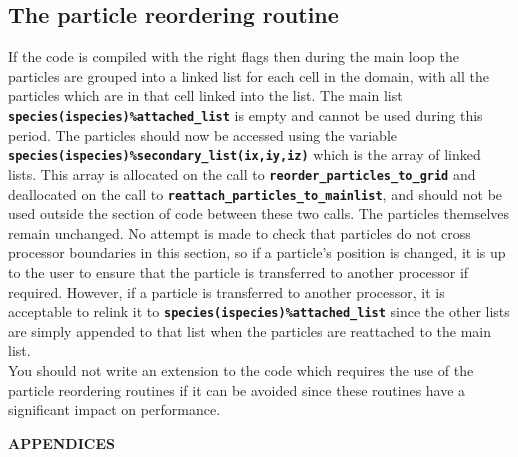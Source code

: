 \documentclass[12pt,a4paper]{article}
\newcommand{\inlinecode}[1]{{\color{warwickred} \bf\texttt{#1}}}
\begin{document}
\subsection{The particle reordering routine}
If the code is compiled with the right flags then during the main loop the
particles are grouped into a linked list for each cell in the domain, with all
the particles which are in that cell linked into the list. The main list
\inlinecode{species(ispecies)\%attached\_list} is empty and cannot be used
during this period. The particles should now be accessed using the variable
\inlinecode{species(ispecies)\%secondary\_list(ix,iy,iz)} which is the array of
linked lists. This array is allocated on the call to
\inlinecode{reorder\_particles\_to\_grid} and deallocated on the call to
\inlinecode{reattach\_particles\_to\_mainlist}, and should not be used outside
the section of code between these two calls. The particles themselves remain
unchanged. No attempt is made to check that particles do not cross processor
boundaries in this section, so if a particle's position is changed, it is up to
the user to ensure that the particle is transferred to another processor if
required. However, if a particle is transferred to another processor, it is
acceptable to relink it to \inlinecode{species(ispecies)\%attached\_list} since
the other lists are simply appended to that list when the particles are
reattached to the main list.\\

You should not write an extension to the code which requires the use of the
particle reordering routines if it can be avoided since these routines
have a significant impact on performance.

\pagebreak

\appendix
  \begin{center}
    {\bf APPENDICES}
  \end{center}
\end{document}
